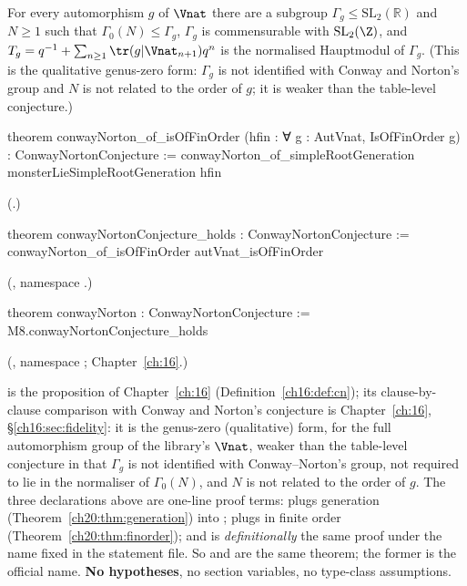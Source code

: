 \begin{theorem}\label{ch20:thm:final}
For every automorphism $g$ of $\Vnat$ there are a subgroup $\Gamma_g\le\mathrm{SL}_2(\mathbb R)$ and $N\ge1$ such that
$\Gamma_0(N)\le\Gamma_g$, $\Gamma_g$ is commensurable with $\mathrm{SL}_2(\Z)$, and $T_g=q^{-1}+\sum_{n\ge1}\tr(g|\Vnat_{n+1})q^n$ is
the normalised Hauptmodul of $\Gamma_g$.  (This is the qualitative genus-zero form: $\Gamma_g$ is not identified with
Conway and Norton's group and $N$ is not related to the order of $g$; it is weaker than the table-level conjecture.)
\end{theorem}
\begin{leancode}
theorem conwayNorton_of_isOfFinOrder (hfin : ∀ g : AutVnat, IsOfFinOrder g) :
    ConwayNortonConjecture :=
  conwayNorton_of_simpleRootGeneration monsterLieSimpleRootGeneration hfin
\end{leancode}
(.)
\begin{leancode}
theorem conwayNortonConjecture_holds : ConwayNortonConjecture :=
  conwayNorton_of_isOfFinOrder autVnat_isOfFinOrder
\end{leancode}
(, namespace .)
\begin{leancode}
theorem conwayNorton : ConwayNortonConjecture :=
  M8.conwayNortonConjecture_holds
\end{leancode}
(, namespace ; Chapter~\ref{ch:16}.)
\begin{dictionary}
 is the proposition of Chapter~\ref{ch:16} (Definition~\ref{ch16:def:cn}); its clause-by-clause
comparison with Conway and Norton's conjecture is Chapter~\ref{ch:16}, \S\ref{ch16:sec:fidelity}: it is the genus-zero
(qualitative) form, for the full automorphism group of the library's $\Vnat$, weaker than the table-level conjecture in that
$\Gamma_g$ is not identified with Conway--Norton's group, not required to lie in the normaliser of $\Gamma_0(N)$, and $N$ is not
related to the order of $g$.  The three declarations above are one-line proof terms:
 plugs generation (Theorem~\ref{ch20:thm:generation}) into
;  plugs in finite order
(Theorem~\ref{ch20:thm:finorder}); and  is \emph{definitionally} the same proof under the
name fixed in the statement file.  So  and  are the same theorem;
the former is the official name.  \textbf{No hypotheses}, no section variables, no type-class assumptions.
\end{dictionary}

